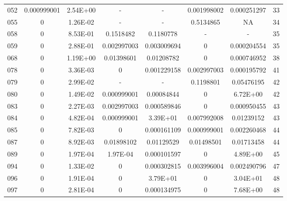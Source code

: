 {\begin{longtable}{cccccccc}
052 & {\color{red}0.000999001} & 2.54E+00 & - & - & {\color{red}0.001998002} & {\color{red}0.000251297} & 33 \\
055 & {\color{red}0} & {\color{red}1.26E-02} & - & - & 0.5134865 & NA & 34 \\
058 & {\color{red}0} & 8.53E-01 & 0.1518482 & 0.1180778 & - & - & 35 \\
059 & {\color{red}0} & 2.88E-01 & {\color{red}0.002997003} & {\color{red}0.003009694} & {\color{red}0} & {\color{red}0.000204554} & 35 \\
068 & {\color{red}0} & 1.19E+00 & {\color{red}0.01398601} & {\color{red}0.01208782} & {\color{red}0} & {\color{red}0.000746952} & 38 \\
078 & {\color{red}0} & {\color{red}3.36E-03} & {\color{red}0} & {\color{red}0.001229158} & {\color{red}0.002997003} & {\color{red}0.000195792} & 41 \\
079 & {\color{red}0} & {\color{red}2.99E-02} & - & - & 0.1198801 & 0.05476195 & 42 \\
080 & {\color{red}0} & {\color{red}1.49E-02} & {\color{red}0.000999001} & {\color{red}0.00084844} & {\color{red}0} & 6.72E+00 & 42 \\
083 & {\color{red}0} & {\color{red}2.27E-03} & {\color{red}0.002997003} & {\color{red}0.000589846} & {\color{red}0} & {\color{red}0.000950455} & 43 \\
084 & {\color{red}0} & {\color{red}4.82E-04} & {\color{red}0.000999001} & 3.39E+01 & {\color{red}0.007992008} & {\color{red}0.01239152} & 43 \\
085 & {\color{red}0} & {\color{red}7.82E-03} & {\color{red}0} & {\color{red}0.000161109} & {\color{red}0.000999001} & {\color{red}0.002260468} & 44 \\
087 & {\color{red}0} & {\color{red}8.92E-03} & {\color{red}0.01898102} & {\color{red}0.01129529} & {\color{red}0.01498501} & {\color{red}0.01713458} & 44 \\
089 & {\color{red}0} & {\color{red}1.97E-04} & {\color{red}1.97E-04} & {\color{red}0.000101597} & {\color{red}0} & 4.89E+00 & 45 \\
094 & {\color{red}0} & {\color{red}1.33E-02} & {\color{red}0} & {\color{red}0.000302815} & {\color{red}0.003996004} & {\color{red}0.002490796} & 47 \\
096 & {\color{red}0} & {\color{red}1.91E-04} & {\color{red}0} & 3.79E+01 & {\color{red}0} & 3.04E+01 & 48 \\
097 & {\color{red}0} & {\color{red}2.81E-04} & {\color{red}0} & {\color{red}0.000134975} & {\color{red}0} & 7.68E+00 & 48 \\

\end{longtable}}
